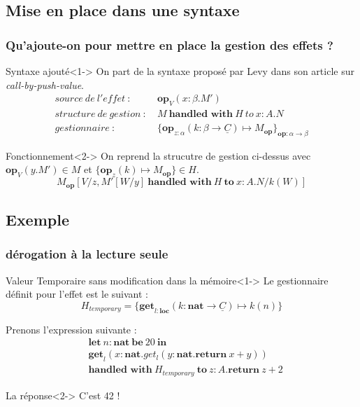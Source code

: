 \documentclass{beamer}
\begin{document}
\subsection{Mise en place dans une syntaxe}
\begin{frame}[fragile]
	\frametitle{Qu'ajoute-on pour mettre en place la gestion des effets ?}
	\begin{block}{Syntaxe ajouté}<1->
		On part de la syntaxe proposé par Levy dans son article sur \textit{call-by-push-value}.
		\begin{align*}
			source~de~l'effet~:~&\textbf{op}_V(x:\beta.M')\\
			structure~de~gestion~:~&M~\textbf{handled~with}~H~to~x:A.N\\
			gestionnaire~:~&\{\textbf{op}_{z:\alpha}(k:\beta \rightarrow \underline{C}) \mapsto M_{\textbf{op}}\}_{\textbf{op} : \alpha \rightarrow \beta}
		\end{align*}
	\end{block}

	\begin{block}{Fonctionnement}<2->
		On reprend la strucutre de gestion ci-dessus 
		avec $\textbf{op}_V(y.M') \in M$ et $\{\textbf{op}_z(k) \mapsto M_ {\textbf{op}}\} \in H$.
			\alert{\[M_{\textbf{op}}[V/z,M'[W/y]~\textbf{handled~with}~H~\textbf{to}~x:A.N/k(W)]\]}
	\end{block}
\end{frame}

\subsection{Exemple}
\begin{frame}
	\frametitle{dérogation à la lecture seule}
	
	\begin{exampleblock}{Valeur Temporaire sans modification dans la mémoire}<1->
		Le gestionnaire définit pour l'effet est le suivant : 
		\[H_{temporary} = \{\textbf{get}_{l:\textbf{loc}}(k:\textbf{nat} \rightarrow \underline{C}) \mapsto k(n)\}\]

		Prenons l'expression suivante : 
		\begin{align*}
			& \textbf{let}~n:\textbf{nat}~\textbf{be}~20~\textbf{in}\\
			& \textbf{get}_l(x:\textbf{nat}.get_l(y:\textbf{nat}.\textbf{return}~x+y))\\
			&\textbf{handled~with}~H_{temporary}~\textbf{to}~z:A.\textbf{return}~z+2
		\end{align*}
	\end{exampleblock}

	\begin{alertblock}{La réponse}<2->
		C'est 42 ! 
	\end{alertblock}
\end{frame}
\end{document}
